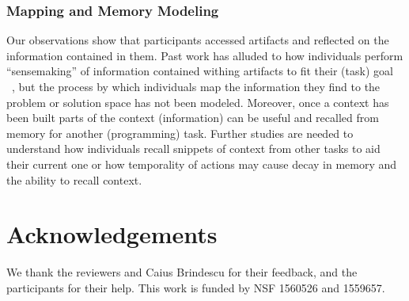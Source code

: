 \subsubsection{Mapping and Memory Modeling}
Our observations show that participants accessed artifacts and reflected on the information contained in them. Past work has alluded to how individuals perform ``sensemaking'' of information contained withing artifacts to fit their (task) goal ~\cite{Grigoreanu:2012}, but the process by which individuals map the information they find to the problem or solution space has not been modeled. Moreover, once a context has been built parts of the context (information) can be useful and recalled from memory for another (programming) task. Further studies are needed to understand how individuals recall snippets of context from other tasks to aid their current one or how temporality of actions may cause decay in memory and the ability to recall context.




\section*{Acknowledgements}
We thank the reviewers and Caius Brindescu for their feedback, and the participants for their help. This work is funded by NSF 1560526 and 1559657. 







